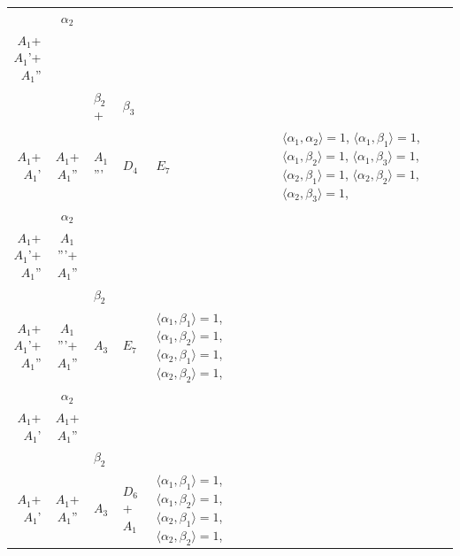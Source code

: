 \documentclass[12pt]{report}
\begin{document}
\begin{appendix}
{\begin{longtable}{rcl p{1cm}p{1cm}p{3cm} }
\begin{tabular}{cc}$\alpha_1$+ & $\alpha_2$\\\tiny{ $A_1$+$A_1$'+$A_1$'' } & \tiny{  }\end{tabular} &\begin{tabular}{c} = \\~ \end{tabular} & \begin{tabular}{ccc}$\beta_1$+ & $\beta_2$+ & $\beta_3$\\\tiny{ $A_1$+$A_1$' } & \tiny{ $A_1$+$A_1$'' } & \tiny{ $A_1$''' }\end{tabular} & $D_4$ & $E_7$ & $\langle\alpha_1, \alpha_2\rangle=1$,  $\langle\alpha_1, \beta_1\rangle=1$, $\langle\alpha_1, \beta_2\rangle=1$, $\langle\alpha_1, \beta_3\rangle=1$, $\langle\alpha_2, \beta_1\rangle=1$, $\langle\alpha_2, \beta_2\rangle=1$, $\langle\alpha_2, \beta_3\rangle=1$, 
\\
\begin{tabular}{cc}$\alpha_1$+ & $\alpha_2$\\\tiny{ $A_1$+$A_1$'+$A_1$'' } & \tiny{ $A_1$'''+$A_1$'' }\end{tabular} &\begin{tabular}{c} = \\~ \end{tabular} & \begin{tabular}{cc}$\beta_1$+ & $\beta_2$\\\tiny{ $A_1$+$A_1$'+$A_1$'' } & \tiny{ $A_1$'''+$A_1$'' }\end{tabular} & $A_3$ & $E_7$ &  $\langle\alpha_1, \beta_1\rangle=1$, $\langle\alpha_1, \beta_2\rangle=1$, $\langle\alpha_2, \beta_1\rangle=1$, $\langle\alpha_2, \beta_2\rangle=1$, 
\\
\begin{tabular}{cc}$\alpha_1$+ & $\alpha_2$\\\tiny{ $A_1$+$A_1$' } & \tiny{ $A_1$+$A_1$'' }\end{tabular} &\begin{tabular}{c} = \\~ \end{tabular} & \begin{tabular}{cc}$\beta_1$+ & $\beta_2$\\\tiny{ $A_1$+$A_1$' } & \tiny{ $A_1$+$A_1$'' }\end{tabular} & $A_3$ & $D_6$+$A_1$ &  $\langle\alpha_1, \beta_1\rangle=1$, $\langle\alpha_1, \beta_2\rangle=1$, $\langle\alpha_2, \beta_1\rangle=1$, $\langle\alpha_2, \beta_2\rangle=1$, 
\\

\end{longtable}}
\end{appendix}
\end{document}
